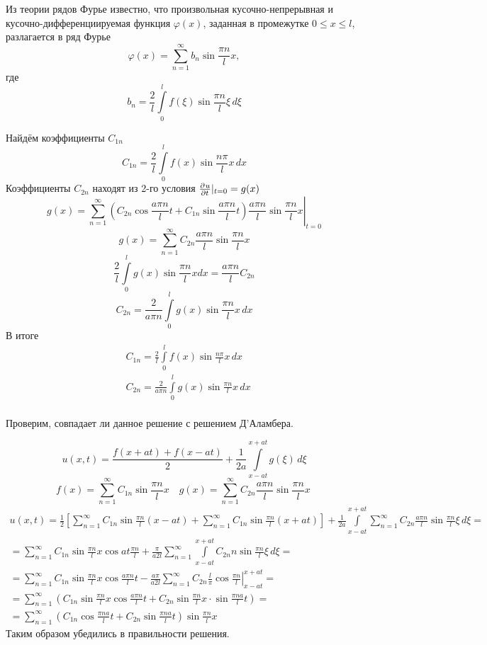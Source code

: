 Из теории рядов Фурье известно, что произвольная кусочно-непрерывная и кусочно-дифференциируемая функция $\varphi(x)$, заданная в промежутке $0 \leqslant x \leqslant l$, разлагается в ряд Фурье
\[
	\varphi(x) = \sum\limits_{n = 1}^\infty b_n \sin \frac{\pi n}{l} x,
\]
где 
\[
	b_n = \frac{2}{l} \int\limits_0^l f(\xi) \sin \frac{\pi n}{l}\xi \, d\xi
\]

Найдём коэффициенты $C_{1n}$
\[
	 C_{1n} = \frac{2}{l} \int\limits_0^l f(x) \sin \frac{n \pi}{l} x\, dx
\]
Коэффициенты $C_{2n}$ находят из 2-го условия $\frac{\partial^{}u}{\partial t^{}} |_{t = 0} = g(x)$\\
\[
	g(x) = \left. \sum\limits_{n = 1}^{\infty}\left(C_{2n}\cos \frac{a \pi n}{l} t + C_{1n} \sin \frac{a \pi n}{l} t \right) \frac{a \pi n}{l} \sin \frac{\pi n}{l} x \right|_{t = 0}
\]
\[
	g(x) = \sum\limits_{n = 1}^{\infty} C_{2n} \frac{a \pi n}{l} \sin \frac{\pi n}{l} x
\]
\[
	\frac{2}{l} \int\limits_0^l g(x) \sin \frac{\pi n}{l} x dx = \frac{a \pi n}{l} C_{2n} 
\]
\[
	C_{2n} = \frac{2}{a \pi n} \int\limits_0^l g(x) \sin \frac{\pi n}{l} x\, dx
\]
В итоге
\begin{align*}
	&C_{1n} = \frac{2}{l} \int\limits_0^l f(x) \sin \frac{n \pi}{l} x\, dx\\
	&C_{2n} = \frac{2}{a \pi n} \int\limits_0^l g(x) \sin \frac{\pi n}{l} x\, dx
\end{align*}\\
Проверим, совпадает ли данное решение с решением Д'Аламбера.

\[	
	u(x, t) = \frac{f(x + at) + f(x - at)}{2} + \frac{1}{2a} \int\limits_{x - at}^{x + at} g(\xi)\, d \xi
\]
\[
	f(x) = \sum\limits_{n = 1}^{\infty} C_{1n} \sin \frac{\pi n}{l} x \quad g(x) = \sum\limits_{n = 1}^{\infty} C_{2n} \frac{a \pi n}{l} \sin \frac{\pi n}{l} x\
\]
\begin{multline*}
	u(x,t) = \frac{1}{2} \left[ \sum\limits_{n = 1}^{\infty} C_{1n} \sin \frac{\pi n}{l} (x - at) + \sum\limits_{n = 1}^{\infty} C_{1n} \sin \frac{\pi n}{l} (x + at)\right] + \frac{1}{2a} \int\limits_{x - at}^{x + at} \sum\limits_{n = 1}^{\infty} C_{2n} \frac{a \pi n}{l} \sin \frac{\pi n}{l} \xi \, d \xi =\\
	= \sum\limits_{n = 1}^{\infty} C_{1n} \sin \frac{\pi n}{l} x \cos at \frac{\pi n}{l} +\frac{\pi}{a 2 l} \sum\limits_{n = 1}^{\infty} \int\limits_{x - at}^{x + at} C_{2n} n \sin\frac{\pi n}{l}\xi \, d \xi =\\
	=\left. \sum\limits_{n = 1}^{\infty}C_{1n} \sin \frac{\pi n}{l} x \cos \frac{a \pi n}{l} t - \frac{a \pi}{a 2 l} \sum\limits_{n = 1}^{\infty} C_{2n} \frac{l}{\pi} \cos \frac{\pi n}{l} \right|_{x - at}^{x + at} =\\
	= \sum\limits_{n = 1}^{\infty} \left( C_{1n}\sin \frac{\pi n}{l} x \cos\frac{a \pi n}{l} t + C_{2n} \sin \frac{\pi n}{l} x \cdot \sin \frac{\pi n a}{l} t\right) =\\
	= \sum\limits_{n = 1}^{\infty} \left(C_{1n} \cos \frac{\pi n a}{l} t +  C_{2n} \sin \frac{\pi n a}{l} t \right) \sin \frac{\pi n}{l} x
\end{multline*}
Таким образом убедились в правильности решения.